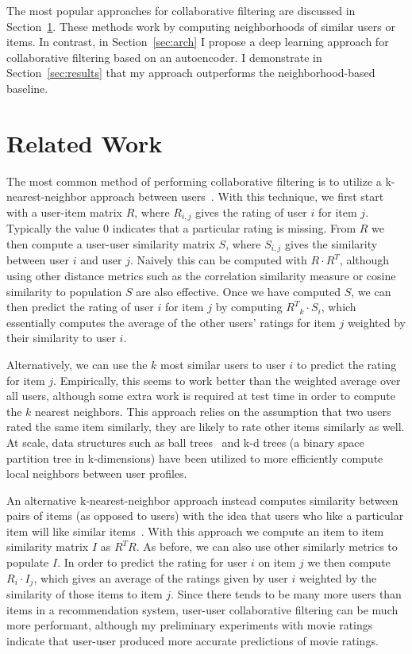 \documentclass[12pt]{article}
\begin{document}
The most popular approaches for collaborative filtering are discussed in
Section~\ref{sec:related}.
These methods work by computing neighborhoods of similar users or items.
In contrast, in Section~\ref{sec:arch} I propose a deep learning approach for
collaborative filtering based on an autoencoder.
I demonstrate in Section~\ref{sec:results} that my approach outperforms
the neighborhood-based baseline.

\section{Related Work}
\label{sec:related}

The most common method of performing collaborative filtering is to utilize a
k-nearest-neighbor approach between users~\cite{user-user}.
With this technique, we first start with a user-item matrix $R$, where
$R_{i,j}$ gives the rating of user $i$ for item $j$.
Typically the value $0$ indicates that a particular rating is missing.
From $R$ we then compute a user-user similarity matrix $S$, where $S_{i,j}$
gives the similarity between user $i$ and user $j$.
Naively this can be computed with $R \cdot R^T$, although using other distance
metrics such as the correlation similarity measure or cosine similarity to
population $S$ are also effective.
Once we have computed $S$, we can then predict the rating of user $i$ for item
$j$ by computing ${R^T}_k \cdot S_i$, which essentially computes the average of
the other users' ratings for item $j$ weighted by their similarity to user $i$.

Alternatively, we can use the $k$ most similar users to user $i$ to predict
the rating for item $j$.
Empirically, this seems to work better than the weighted average over all
users, although some extra work is required at test time in order to compute
the $k$ nearest neighbors.
This approach relies on the assumption that two users rated the same item
similarly, they are likely to rate other items similarly as well.
At scale, data structures such as ball trees~\cite{ball-tree} and k-d trees (a
binary space partition tree in k-dimensions) have been utilized to more
efficiently compute local neighbors between user profiles.

An alternative k-nearest-neighbor approach instead computes similarity between
pairs of items (as opposed to users) with the idea that users who like a
particular item will like similar items~\cite{item-item}.
With this approach we compute an item to item similarity matrix $I$ as $R^T R$.
As before, we can also use other similarly metrics to populate $I$.
In order to predict the rating for user $i$ on item $j$ we then compute $R_i
\cdot I_j$, which gives an average of the ratings given by user $i$ weighted by
the similarity of those items to item $j$.
Since there tends to be many more users than items in a recommendation system,
user-user collaborative filtering can be much more performant, although my
preliminary experiments with movie ratings indicate that user-user produced
more accurate predictions of movie ratings.
\end{document}
